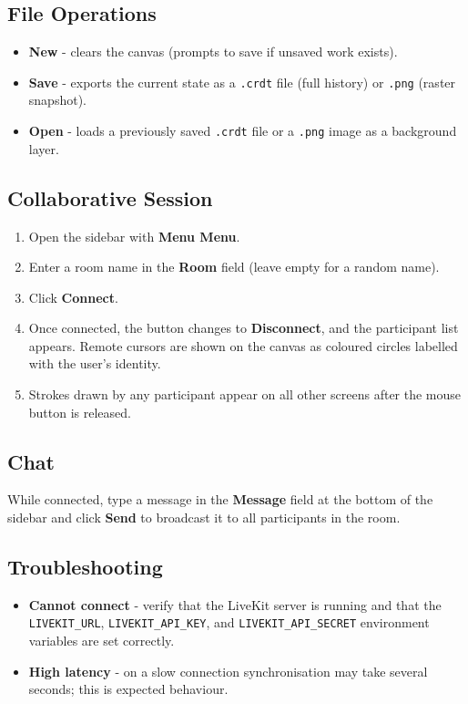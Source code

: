 \documentclass[a4paper,11pt,twoside]{report}
\theoremstyle{definition}
\begin{document}
\subsection*{File Operations}

\begin{itemize}
    \item \textbf{New} - clears the canvas (prompts to save if unsaved work exists).
    \item \textbf{Save} - exports the current state as a \texttt{.crdt} file (full
    history) or \texttt{.png} (raster snapshot).
    \item \textbf{Open} - loads a previously saved \texttt{.crdt} file or a \texttt{.png}
    image as a background layer.
\end{itemize}

\subsection*{Collaborative Session}

\begin{enumerate}
    \item Open the sidebar with \textbf{Menu Menu}.
    \item Enter a room name in the \textbf{Room} field (leave empty for a random name).
    \item Click \textbf{Connect}.
    \item Once connected, the button changes to \textbf{Disconnect}, and the participant
    list appears. Remote cursors are shown on the canvas as coloured circles labelled with
    the user's identity.
    \item Strokes drawn by any participant appear on all other screens after the mouse
    button is released.
\end{enumerate}

\subsection*{Chat}

While connected, type a message in the \textbf{Message} field at the bottom of the
sidebar and click \textbf{Send} to broadcast it to all participants in the room.

\subsection*{Troubleshooting}

\begin{itemize}
    \item \textbf{Cannot connect} - verify that the LiveKit server is running and that
    the \texttt{LIVEKIT\_URL}, \texttt{LIVEKIT\_API\_KEY}, and
    \texttt{LIVEKIT\_API\_SECRET} environment variables are set correctly.
    \item \textbf{High latency} - on a slow connection synchronisation may take several
    seconds; this is expected behaviour.
\end{itemize}
\end{document}
